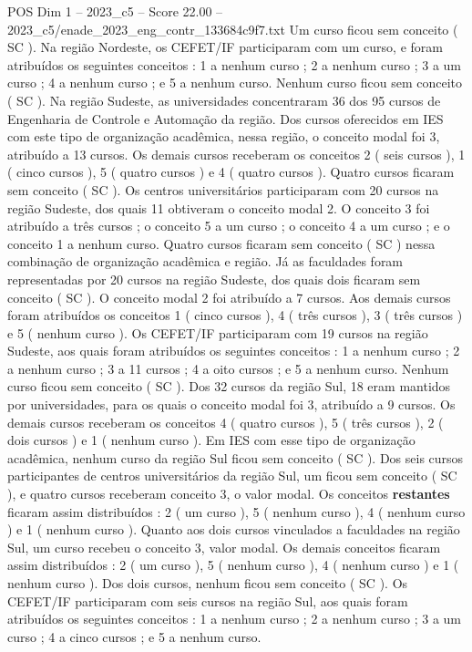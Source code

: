 \begin{textsample}{POS Dim 1 – 2023\_c5 – Score 22.00 – 2023\_c5/enade\_2023\_eng\_contr\_133684c9f7.txt}
Um curso ficou sem conceito ( SC ).
Na região Nordeste, os CEFET/IF participaram com um curso, e foram atribuídos os seguintes conceitos : 1 a nenhum curso ; 2 a nenhum curso ; 3 a um curso ; 4 a nenhum curso ; e 5 a nenhum curso.
Nenhum curso ficou sem conceito ( SC ).
Na região Sudeste, as universidades concentraram 36 dos 95 cursos de Engenharia de Controle e Automação da região.
Dos cursos oferecidos em IES com este tipo de organização acadêmica, nessa região, o conceito modal foi 3, atribuído a 13 cursos.
Os demais cursos receberam os conceitos 2 ( seis cursos ), 1 ( cinco cursos ), 5 ( quatro cursos ) e 4 ( quatro cursos ).
Quatro cursos ficaram sem conceito ( SC ).
Os centros universitários participaram com 20 cursos na região Sudeste, dos quais 11 obtiveram o conceito modal 2.
O conceito 3 foi atribuído a três cursos ; o conceito 5 a um curso ; o conceito 4 a um curso ; e o conceito 1 a nenhum curso.
Quatro cursos ficaram sem conceito ( SC ) nessa combinação de organização acadêmica e região.
Já as faculdades foram representadas por 20 cursos na região Sudeste, dos quais dois ficaram sem conceito ( SC ).
O conceito modal 2 foi atribuído a 7 cursos.
Aos demais cursos foram atribuídos os conceitos 1 ( cinco cursos ), 4 ( três cursos ), 3 ( três cursos ) e 5 ( nenhum curso ).
Os CEFET/IF participaram com 19 cursos na região Sudeste, aos quais foram atribuídos os seguintes conceitos : 1 a nenhum curso ; 2 a nenhum curso ; 3 a 11 cursos ; 4 a oito cursos ; e 5 a nenhum curso.
Nenhum curso ficou sem conceito ( SC ).
Dos 32 cursos da região Sul, 18 eram mantidos por universidades, para os quais o conceito modal foi 3, atribuído a 9 cursos.
Os demais cursos receberam os conceitos 4 ( quatro cursos ), 5 ( três cursos ), 2 ( dois cursos ) e 1 ( nenhum curso ).
Em IES com esse tipo de organização acadêmica, nenhum curso da região Sul ficou sem conceito ( SC ).
Dos seis cursos participantes de centros universitários da região Sul, um ficou sem conceito ( SC ), e quatro cursos receberam conceito 3, o valor modal.
Os conceitos \textbf{restantes} ficaram assim distribuídos : 2 ( um curso ), 5 ( nenhum curso ), 4 ( nenhum curso ) e 1 ( nenhum curso ).
Quanto aos dois cursos vinculados a faculdades na região Sul, um curso recebeu o conceito 3, valor modal.
Os demais conceitos ficaram assim distribuídos : 2 ( um curso ), 5 ( nenhum curso ), 4 ( nenhum curso ) e 1 ( nenhum curso ).
Dos dois cursos, nenhum ficou sem conceito ( SC ).
Os CEFET/IF participaram com seis cursos na região Sul, aos quais foram atribuídos os seguintes conceitos : 1 a nenhum curso ; 2 a nenhum curso ; 3 a um curso ; 4 a cinco cursos ; e 5 a nenhum curso.

\end{textsample}
